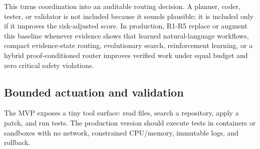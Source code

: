 This turns coordination into an auditable routing decision. A planner,
coder, tester, or validator is not included because it sounds plausible;
it is included only if it improves the risk-adjusted score. In
production, R1-R5 replace or augment this baseline whenever evidence
shows that learned natural-language workflows, compact evidence-state
routing, evolutionary search, reinforcement learning, or a hybrid
proof-conditioned router improves verified work under equal budget and
zero critical safety violations.

\subsection{Bounded actuation and
validation}\label{bounded-actuation-and-validation}

The MVP exposes a tiny tool surface: read files, search a repository,
apply a patch, and run tests. The production version should execute
tests in containers or sandboxes with no network, constrained
CPU/memory, immutable logs, and rollback.

\begin{Shaded}
\begin{Highlighting}[]
     \NormalTok{(}\NormalTok{):}
        \OperatorTok{=}

    \NormalTok{) }\OperatorTok{{-}\textgreater{}}
\OperatorTok{=}\NormalTok{ (}\OperatorTok{/}
          \NormalTok{(}
             \NormalTok{(}\NormalTok{)}

    \NormalTok{) }\OperatorTok{{-}\textgreater{}} \NormalTok{:}
\OperatorTok{=}\NormalTok{ subprocess.run([}\NormalTok{, }\NormalTok{, }\NormalTok{], }\OperatorTok{=}\OperatorTok{=}\NormalTok{,}
\OperatorTok{=}\OperatorTok{=}\NormalTok{)}
        \NormalTok{ \{}\OperatorTok{==} \NormalTok{, }
\end{Highlighting}
\end{Shaded}

